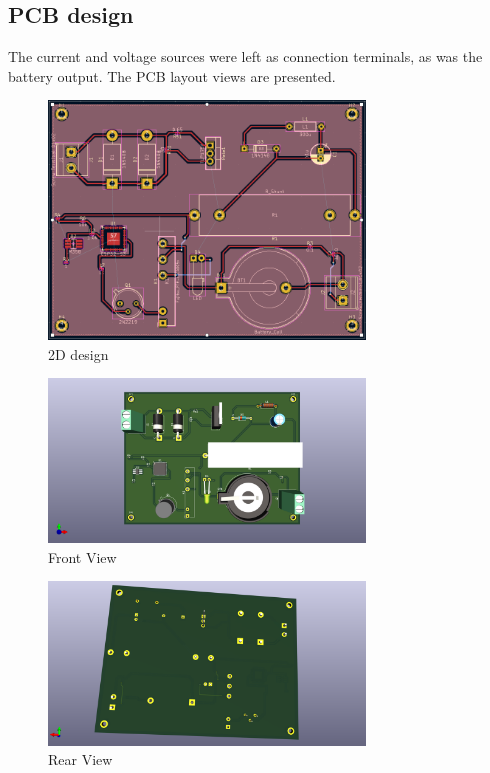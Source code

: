 \subsection{PCB design}
The current and voltage sources were left as connection terminals, as was the battery output. The PCB layout views are presented.

\begin{figure}[H]
    \centering
    \includegraphics[width=0.75\textwidth]{image/PCB1}
    \caption{2D design}\label{PCB1}
\end{figure}

\begin{figure}[H]
    \centering
    \includegraphics[width=0.75\textwidth]{image/PCB2}
    \caption{Front View}\label{PCB2}
\end{figure}

\begin{figure}[H]
    \centering
    \includegraphics[width=0.75\textwidth]{image/PCB3}
    \caption{Rear View}\label{PCB3}
\end{figure}


